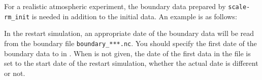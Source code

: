 For a realistic atmospheric experiment, the boundary data prepared by \verb|scale-rm_init|
is needed in addition to the initial data. An example is as follows:


In the restart simulation, an appropriate date of the boundary data will be read from the boundary file \verb|boundary_***.nc|.
You should specify the first date of the boundary data to  in .
When  is not given, the date of the first data in the file is set to the start date of the restart simulation, whether the actual date is different or not.
